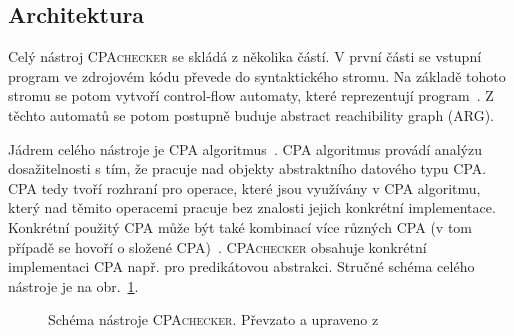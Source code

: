 \documentclass[a4paper,12pt]{article}
\begin{document}
\subsection{Architektura}
Celý nástroj \textsc{CPAchecker} se skládá z několika částí. V první části se vstupní program ve zdrojovém kódu
převede do syntaktického stromu. Na základě tohoto stromu se potom vytvoří control-flow automaty, které reprezentují program~\cite{cpa}. 
Z těchto automatů se potom postupně buduje abstract reachibility graph (ARG).

Jádrem 
celého nástroje je CPA algoritmus~\cite{alg}. CPA algoritmus provádí analýzu dosažitelnosti s tím, že pracuje nad objekty abstraktního
datového typu CPA. CPA tedy tvoří rozhraní pro operace, které jsou využívány v CPA algoritmu, který nad těmito operacemi
pracuje bez znalosti jejich konkrétní implementace. Konkrétní použitý CPA může být také kombinací více různých CPA (v tom případě
se hovoří o složené CPA)~\cite{cpa}. \textsc{CPAchecker} obsahuje konkrétní implementaci CPA např. pro predikátovou abstrakci. Stručné schéma
celého nástroje je na obr.~\ref{fig:sch}.

\begin{figure}[h!]
\begin{center}
\end{center}
\caption{Schéma nástroje \textsc{CPAchecker}. Převzato a upraveno z~\cite{cpa}}
\label{fig:sch}
\end{figure}
\end{document}

